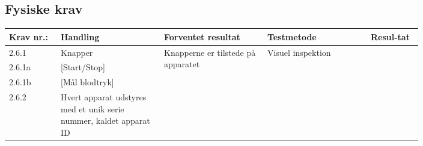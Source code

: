 \documentclass[12pt, a4paper]{memoir}
\begin{document}
\begin{landscape}
			\subsection{Fysiske krav}
				\begin{longtable}{|p{0.1\linewidth}|p{0.2\linewidth}|p{0.2\linewidth}|p{0.2\linewidth}|p{0.1\linewidth}|}
					\hline
					Krav nr.: & Handling & Forventet resultat & Testmetode & Resul-tat  \\\hline
					2.6.1& Knapper & \multirow{4}{\linewidth}{Knapperne er tilstede på apparatet}  & \multirow{4}{\linewidth}{Visuel inspektion}  & \multirow{4}{\linewidth}{}  \\ \cline{1-2}
					2.6.1a& [Start/Stop] & &  & \\ \cline{1-2}
					2.6.1b& [Mål blodtryk] & &  & \\ \cline{1-2}
					2.6.2& Hvert apparat udstyres med et unik serie nummer, kaldet apparat ID & &  & \\ \hline
				\end{longtable}
	\end{landscape}
	
\end{document}
